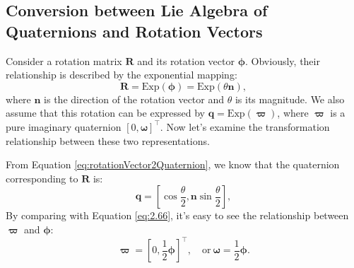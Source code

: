 \subsection{Conversion between Lie Algebra of Quaternions and Rotation Vectors}
Consider a rotation matrix $\mathbf{R}$ and its rotation vector $\boldsymbol{\phi}$. Obviously, their relationship is described by the exponential mapping:
\begin{equation}
	\mathbf{R} = \mathrm{Exp} (\boldsymbol{\phi}) = \mathrm{Exp}(\theta \mathbf{n}),
\end{equation}
where $\mathbf{n}$ is the direction of the rotation vector and $\theta$ is its magnitude. We also assume that this rotation can be expressed by $\mathbf{q} = 
\mathrm{Exp} (\boldsymbol{\varpi})$, where $\boldsymbol{\varpi}$ is a pure imaginary quaternion $[0, 
\boldsymbol{\omega}]^\top$. Now let's examine the transformation relationship between these two representations.

From Equation \eqref{eq:rotationVector2Quaternion}, we know that the quaternion corresponding to $\mathbf{R}$ is:
\begin{equation}\label{key}
	\mathbf{q} = [\cos \frac{\theta}{2}, \mathbf{n} \sin \frac{\theta}{2}],
\end{equation}
By comparing with Equation \eqref{eq:2.66}, it's easy to see the relationship between $\boldsymbol{\varpi}$ and $\boldsymbol{\phi}$:
\begin{equation}\label{key}
	\boldsymbol{\varpi} = [0, \frac{1}{2} \boldsymbol{\phi}]^\top, \quad \text{or} \  
	\boldsymbol{\omega} = \frac{1}{2} \boldsymbol{\phi}.
\end{equation}


